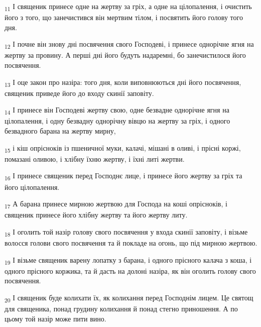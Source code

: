 \begin{tcolorbox}
\textsubscript{11} І священик принесе одне на жертву за гріх, а одне на цілопалення, і очистить його з того, що занечистився він мертвим тілом, і посвятить його голову того дня.
\end{tcolorbox}
\begin{tcolorbox}
\textsubscript{12} І почне він знову дні посвячення свого Господеві, і принесе однорічне ягня на жертву за провину. А перші дні його будуть надаремні, бо занечистилося його посвячення.
\end{tcolorbox}
\begin{tcolorbox}
\textsubscript{13} І оце закон про назіра: того дня, коли виповнюються дні його посвячення, священик приведе його до входу скинії заповіту.
\end{tcolorbox}
\begin{tcolorbox}
\textsubscript{14} І принесе він Господеві жертву свою, одне безвадне однорічне ягня на цілопалення, і одну безвадну однорічну вівцю на жертву за гріх, і одного безвадного барана на жертву мирну,
\end{tcolorbox}
\begin{tcolorbox}
\textsubscript{15} і кіш опрісноків із пшеничної муки, калачі, мішані в оливі, і прісні коржі, помазані оливою, і хлібну їхню жертву, і їхні литі жертви.
\end{tcolorbox}
\begin{tcolorbox}
\textsubscript{16} І принесе священик перед Господнє лице, і принесе його жертву за гріх та його цілопалення.
\end{tcolorbox}
\begin{tcolorbox}
\textsubscript{17} А барана принесе мирною жертвою для Господа на коші опрісноків, і священик принесе його хлібну жертву та його жертву литу.
\end{tcolorbox}
\begin{tcolorbox}
\textsubscript{18} І оголить той назір голову свого посвячення у входа скинії заповіту, і візьме волосся голови свого посвячення та й покладе на огонь, що під мирною жертвою.
\end{tcolorbox}
\begin{tcolorbox}
\textsubscript{19} І візьме священик варену лопатку з барана, і одного прісного калача з коша, і одного прісного коржика, та й дасть на долоні назіра, як він оголить голову свого посвячення.
\end{tcolorbox}
\begin{tcolorbox}
\textsubscript{20} І священик буде колихати їх, як колихання перед Господнім лицем. Це святощ для священика, понад грудину колихання й понад стегно приношення. А по цьому той назір може пити вино.
\end{tcolorbox}
